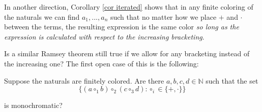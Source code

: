 \documentclass[tocmacros]{daj}
\begin{document}

In another direction, Corollary \ref{cor iterated} shows that in any finite coloring of the naturals we can find $a_1,...,a_n$ such that no matter how we place $+$ and $\cdot$ between the terms, the resulting expression is the same color \textit{so long as the expression is calculated with respect to the increasing bracketing}.  

Is a similar Ramsey theorem still true if we allow for any bracketing instead of the increasing one?  The first open case of this is the following:

\begin{question}
Suppose the naturals are finitely colored.  Are there $a,b,c,d\in\mathbb{N}$ such that the set $$\{(a\circ_1 b)\circ_2(c\circ_3 d) : \circ_i\in \{+,\cdot\} \}$$

is monochromatic?
\end{question}





\end{document}
